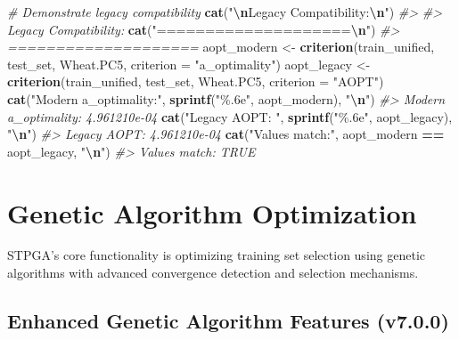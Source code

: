 \documentclass[
]{article}
\newenvironment{Shaded}{\begin{snugshade}}{\end{snugshade}}
\newcommand{\AttributeTok}[1]{\textcolor[rgb]{0.13,0.29,0.53}{#1}}
\newcommand{\CommentTok}[1]{\textcolor[rgb]{0.56,0.35,0.01}{\textit{#1}}}
\newcommand{\FunctionTok}[1]{\textcolor[rgb]{0.13,0.29,0.53}{\textbf{#1}}}
\newcommand{\NormalTok}[1]{#1}
\newcommand{\OtherTok}[1]{\textcolor[rgb]{0.56,0.35,0.01}{#1}}
\newcommand{\SpecialCharTok}[1]{\textcolor[rgb]{0.81,0.36,0.00}{\textbf{#1}}}
\newcommand{\StringTok}[1]{\textcolor[rgb]{0.31,0.60,0.02}{#1}}
\begin{document}
\begin{Shaded}
\begin{Highlighting}[]
\CommentTok{\# Demonstrate legacy compatibility}
\FunctionTok{cat}\NormalTok{(}\StringTok{"}\SpecialCharTok{\textbackslash{}n}\StringTok{Legacy Compatibility:}\SpecialCharTok{\textbackslash{}n}\StringTok{"}\NormalTok{)}
\CommentTok{\#\textgreater{} }
\CommentTok{\#\textgreater{} Legacy Compatibility:}
\FunctionTok{cat}\NormalTok{(}\StringTok{"====================}\SpecialCharTok{\textbackslash{}n}\StringTok{"}\NormalTok{)}
\CommentTok{\#\textgreater{} ====================}
\NormalTok{aopt\_modern }\OtherTok{\textless{}{-}} \FunctionTok{criterion}\NormalTok{(train\_unified, test\_set, Wheat.PC5, }\AttributeTok{criterion =} \StringTok{"a\_optimality"}\NormalTok{)}
\NormalTok{aopt\_legacy }\OtherTok{\textless{}{-}} \FunctionTok{criterion}\NormalTok{(train\_unified, test\_set, Wheat.PC5, }\AttributeTok{criterion =} \StringTok{"AOPT"}\NormalTok{)}
\FunctionTok{cat}\NormalTok{(}\StringTok{"Modern a\_optimality:"}\NormalTok{, }\FunctionTok{sprintf}\NormalTok{(}\StringTok{"\%.6e"}\NormalTok{, aopt\_modern), }\StringTok{"}\SpecialCharTok{\textbackslash{}n}\StringTok{"}\NormalTok{)}
\CommentTok{\#\textgreater{} Modern a\_optimality: 4.961210e{-}04}
\FunctionTok{cat}\NormalTok{(}\StringTok{"Legacy AOPT:        "}\NormalTok{, }\FunctionTok{sprintf}\NormalTok{(}\StringTok{"\%.6e"}\NormalTok{, aopt\_legacy), }\StringTok{"}\SpecialCharTok{\textbackslash{}n}\StringTok{"}\NormalTok{)}
\CommentTok{\#\textgreater{} Legacy AOPT:         4.961210e{-}04}
\FunctionTok{cat}\NormalTok{(}\StringTok{"Values match:"}\NormalTok{, aopt\_modern }\SpecialCharTok{==}\NormalTok{ aopt\_legacy, }\StringTok{"}\SpecialCharTok{\textbackslash{}n}\StringTok{"}\NormalTok{)}
\CommentTok{\#\textgreater{} Values match: TRUE}
\end{Highlighting}
\end{Shaded}

\section{Genetic Algorithm
Optimization}\label{genetic-algorithm-optimization}

STPGA's core functionality is optimizing training set selection using
genetic algorithms with advanced convergence detection and selection
mechanisms.

\subsection{Enhanced Genetic Algorithm Features
(v7.0.0)}\label{enhanced-genetic-algorithm-features-v7.0.0}
\end{document}

